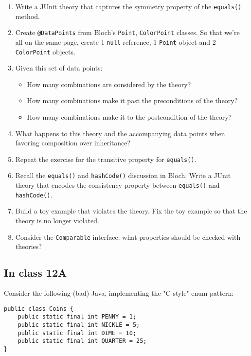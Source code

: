 \documentclass[11pt]{article}
\begin{document}
\begin{enumerate}
\item Write a JUnit theory that captures the symmetry property of the \texttt{equals()} method.
\item Create \texttt{@DataPoints} from Bloch's \texttt{Point}, \texttt{ColorPoint} classes. So that we're all on the same page, create 1 \texttt{null} reference, 1 \texttt{Point} object and 2 \texttt{ColorPoint} objects.
\item Given this set of data points:
\begin{itemize}
\item How many combinations are considered by the theory?
\item How many combinations make it past the preconditions of the theory?
\item How many combinations make it to the postcondition of the theory?
\end{itemize}
\item What happens to this theory and the accompanying data points when favoring composition over inheritance?
\item Repeat the exercise for the transitive property for \texttt{equals()}.
\item Recall the \texttt{equals()} and \texttt{hashCode()} discussion in Bloch. Write a JUnit theory that encodes the consistency property between \texttt{equals()} and \texttt{hashCode()}.
\item Build a toy example that violates the theory. Fix the toy example so that the theory is no longer violated.
\item Consider the \texttt{Comparable} interface: what properties should be checked with theories?
\end{enumerate}

\subsection{In class 12A}
\label{sec:org16fff9b}
Consider the following (bad) Java, implementing the "C style" enum pattern:

\begin{verbatim}
public class Coins {
    public static final int PENNY = 1;
    public static final int NICKLE = 5;
    public static final int DIME = 10;
    public static final int QUARTER = 25;
}

\end{verbatim}
\end{document}
